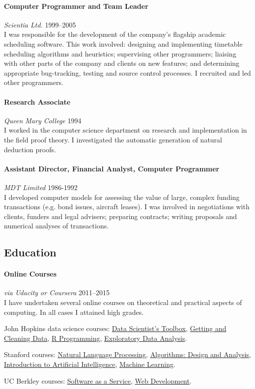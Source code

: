 \documentclass[11pt,a4paper]{article}
\newcommand{\centry}[3]{\paragraph{#1} \textit{#2}%
\hfill#3\\[2pt]}
\begin{document}
\centry{Computer Programmer and Team Leader}{Scientia Ltd.}{1999--2005} I was
responsible for the development of the company's flagship academic scheduling
software. This work involved: designing and implementing timetable scheduling
algorithms and heuristics; supervising other programmers; liaising with other
parts of the company and clients on new features; and determining appropriate
bug-tracking, testing and source control processes. I recruited and led other
programmers.


\centry{Research Associate}{Queen Mary College}{1994}
I worked in the computer science department on research and implementation in
the field proof theory. I investigated the automatic generation of natural
deduction proofs.

\centry{Assistant Director, Financial Analyst, Computer Programmer}{MDT
  Limited}{1986-1992}
I developed computer models for assessing the value of large, complex
funding transactions (e.g. bond issues, aircraft leases). I was involved in
negotiations with clients, funders and legal advisers; preparing contracts;
writing proposals and numerical analyses of transactions.


\subsection*{Education}

\centry{Online Courses}{\emph{via} Udacity or Coursera}{2011--2015} I have undertaken several online courses
on theoretical and practical aspects of computing. In all cases I attained high
grades.
\begin{enumerate*}[label=(\alph*)]
\item John Hopkins data science courses:
  \href{https://drive.google.com/open?id=0BzIgco934WByWEt1RVdxazVSckk}{Data
    Scientist's Toolbox},
  \href{https://drive.google.com/open?id=0BzIgco934WByeWdrM0pNMndVS2M}{Getting
    and Cleaning Data},
  \href{https://drive.google.com/open?id=0BzIgco934WBydkxiNGJTUFNCQVU}{R
    Programming},
  \href{https://drive.google.com/open?id=0BzIgco934WByTmtVYjl3MXROZG8}{Exploratory
    Data Analysis}.
\item Stanford courses:
  \href{https://drive.google.com/open?id=0BzIgco934WByR3NldDVjVTFfR2s}{Natural
    Language Processing},
  \href{https://drive.google.com/open?id=0BzIgco934WByZ0VLRm1KWjlTaGM}{Algorithms:
    Design and Analysis},
  \href{https://drive.google.com/open?id=0BzIgco934WBydEY5TWJVcmltREk}{Introduction
    to Artificial Intelligence}, \href{https://drive.google.com/open?id=0BzIgco934WByZ0VLRm1KWjlTaGM}{Machine Learning}.
\item UC Berkley courses: \href{https://drive.google.com/open?id=0BzIgco934WByZ0VLRm1KWjlTaGM}{Software as a Service}, \href{https://drive.google.com/open?id=0BzIgco934WByRDJJYWpCZkx0OHc}{Web Development}.
\end{enumerate*}
\end{document}
